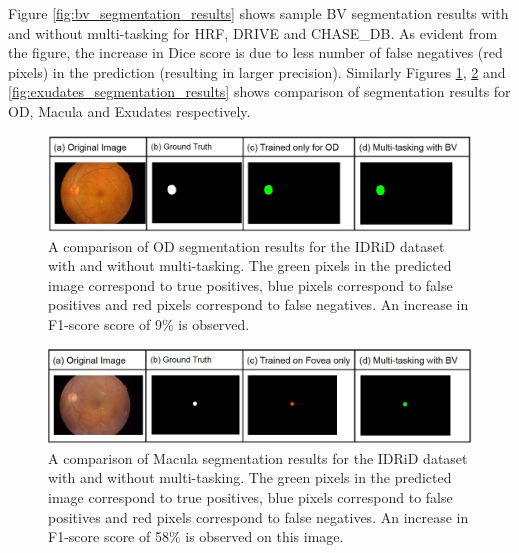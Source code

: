 \documentclass[utf8]{FrontiersinHarvard} %
\begin{document}
Figure \ref{fig:bv_segmentation_results} shows  sample BV segmentation results with and without multi-tasking for HRF, DRIVE and CHASE\_DB. As evident from the figure, the increase in Dice score is due to less number of false negatives (red pixels) in the prediction (resulting in larger precision). Similarly Figures \ref{fig:od_segmentation_results}, \ref{fig:fovea_segmentation_results} and \ref{fig:exudates_segmentation_results} shows comparison of segmentation results for OD, Macula and Exudates respectively.

\begin{figure}[h!]
\begin{center}
\includegraphics[width=15cm]{images/od_results.jpg}%
\end{center}
\caption{A comparison of OD segmentation results for the IDRiD dataset with and without multi-tasking. The green pixels in the predicted image correspond to true positives, blue pixels correspond to false positives and  red pixels correspond to false negatives. An increase in F1-score score of 9\% is observed.}

\label{fig:od_segmentation_results}
\end{figure}

\begin{figure}[h!]
\begin{center}
\includegraphics[width=15cm]{images/fovea_results.jpg}%
\end{center}
\caption{A comparison of Macula segmentation results for the IDRiD dataset with and without multi-tasking. The green pixels in the predicted image correspond to true positives, blue pixels correspond to false positives and  red pixels correspond to false negatives. An increase in F1-score score of 58\% is observed on this image.}
\label{fig:fovea_segmentation_results}
\end{figure}
\end{document}
